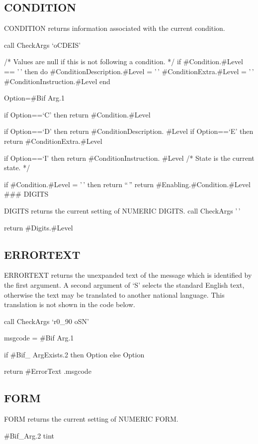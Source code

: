 \subsection{CONDITION}\label{condition}

CONDITION returns information associated with the current condition.

call CheckArgs `oCDEIS'

/* Values are null if this is not following a condition. */ if
\#Condition.\#Level == '\,' then do \#ConditionDescription.\#Level =
'\,' \#ConditionExtra.\#Level = '\,' \#ConditionInstruction.\#Level end

Option=\#Bif Arg.1

if Option==`C' then return \#Condition.\#Level

if Option==`D' then return \#ConditionDescription. \#Level if
Option==`E' then return \#ConditionExtra.\#Level

if Option==`I' then return \#ConditionInstruction. \#Level /* State is
the current state. */

if \#Condition.\#Level = '\,' then return ``\,'' return
\#Enabling.\#Condition.\#Level \#\#\# DIGITS

DIGITS returns the current setting of NUMERIC DIGITS. call CheckArgs
'\,'

return \#Digits.\#Level

\subsection{ERRORTEXT}\label{errortext}

ERRORTEXT returns the unexpanded text of the message which is identified
by the first argument. A second argument of `S' selects the standard
English text, otherwise the text may be translated to another national
language. This translation is not shown in the code below.

call CheckArgs `r0\_90 oSN'

msgcode = \#Bif Arg.1

if \#Bif\_ ArgExists.2 then Option else Option

return \#ErrorText .msgcode

\subsection{FORM}\label{form}

FORM returns the current setting of NUMERIC FORM.

\#Bif\_Arg.2 tint

